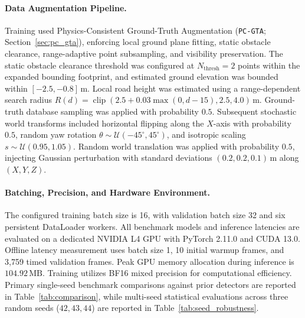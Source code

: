 \paragraph{Data Augmentation Pipeline.}
Training used Physics-Consistent Ground-Truth Augmentation (\texttt{PC-GTA}; Section~\ref{sec:pc_gta}), enforcing local ground plane fitting, static obstacle clearance, range-adaptive point subsampling, and visibility preservation. The static obstacle clearance threshold was configured at $N_{\mathrm{thresh}} = 2$ points within the expanded bounding footprint, and estimated ground elevation was bounded within $[-2.5, -0.8]\,\text{m}$. Local road height was estimated using a range-dependent search radius $R(d) = \operatorname{clip}(2.5 + 0.03\max(0, d - 15), 2.5, 4.0)\,\text{m}$. Ground-truth database sampling was applied with probability $0.5$. Subsequent stochastic world transforms included horizontal flipping along the $X$-axis with probability $0.5$, random yaw rotation $\theta \sim \mathcal{U}(-45^\circ,45^\circ)$, and isotropic scaling $s \sim \mathcal{U}(0.95,1.05)$. Random world translation was applied with probability $0.5$, injecting Gaussian perturbation with standard deviations $(0.2,0.2,0.1)\,\text{m}$ along $(X,Y,Z)$.



\paragraph{Batching, Precision, and Hardware Environment.}
The configured training batch size is 16, with validation batch size 32 and six persistent DataLoader workers. All benchmark models and inference latencies are evaluated on a dedicated NVIDIA L4 GPU with PyTorch 2.11.0 and CUDA 13.0. Offline latency measurement uses batch size 1, 10 initial warmup frames, and 3,759 timed validation frames. Peak GPU memory allocation during inference is $104.92\,\text{MB}$. Training utilizes BF16 mixed precision for computational efficiency. Primary single-seed benchmark comparisons against prior detectors are reported in Table~\ref{tab:comparison}, while multi-seed statistical evaluations across three random seeds ($42, 43, 44$) are reported in Table~\ref{tab:seed_robustness}.
